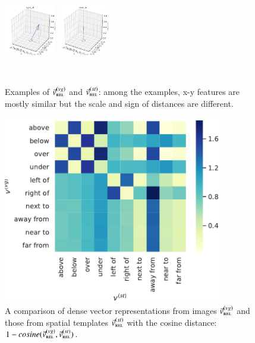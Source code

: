 \begin{figure}
\begin{minipage}{\textwidth}
		\includegraphics[width=0.2\textwidth]{studies/sc2020/figures/right_of_st_features.pdf}
		\includegraphics[width=0.2\textwidth]{studies/sc2020/figures/next_to_st_features.pdf}
	\end{minipage}\\
	\caption{Examples of $\vec{v}_{\textsc{rel}}^{(vg)}$ and  $\vec{v}_{\textsc{rel}}^{(st)}$: among the examples, x-y features are mostly similar but the scale and sign of distances are different.} \label{sc2020:fig:vg-st:samples}
\end{figure}

\begin{figure}
	\centering
	\begin{minipage}{0.6\textwidth}
		\centering
		\includegraphics[width=0.85\textwidth]{studies/sc2020/figures/heatmap_distance_st_vg.pdf}
	\end{minipage}%
	\caption{A comparison of dense vector representations from images $\vec{v}_{\textsc{rel}}^{(vg)}$ and those from spatial templates $\vec{v}_{\textsc{rel}}^{(st)}$ with the cosine distance: $1-cosine(\vec{v}_{\textsc{rel}}^{(vg)}, \vec{v}_{\textsc{rel}}^{(st)})$. } \label{sc2020:fig:vg-st}
\end{figure}



